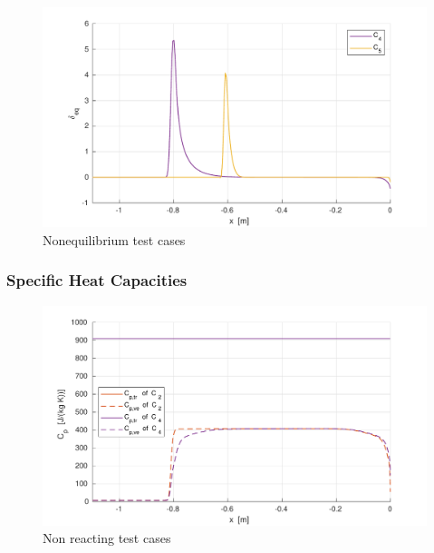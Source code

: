 \documentclass[10pt]{beamer}
\begin{document}
\begin{frame}
  \begin{figure}[ht]
    \centering
    \includegraphics[width=\textwidth]{stagnationLine/figures/levelNoneq.pdf}
    \caption{Nonequilibrium test cases}
  \end{figure}
\end{frame}

\begin{frame}
  \frametitle{Specific Heat Capacities}
  \begin{figure}[ht]
    \centering
    \includegraphics[width=\textwidth]{stagnationLine/figures/specificHeatNReac.pdf}
    \caption{Non reacting test cases}
  \end{figure}
\end{frame}
\end{document}
